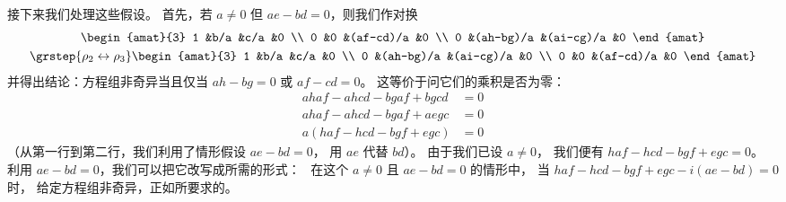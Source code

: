 \begin{answer}
\begin{exparts}
         接下来我们处理这些假设。
         首先，若 \( a\neq 0 \) 但 \( ae-bd=0 \)，则我们作对换
         \begin{multline*}
           \begin{amat}{3}
              1   &b/a           &c/a        &0   \\
              0   &0             &(af-cd)/a  &0   \\
              0   &(ah-bg)/a     &(ai-cg)/a  &0
            \end{amat}                                    \\
           \grstep{\rho_2\leftrightarrow\rho_3}
           \begin{amat}{3}
              1   &b/a           &c/a        &0   \\
              0   &(ah-bg)/a     &(ai-cg)/a  &0   \\
              0   &0             &(af-cd)/a  &0
            \end{amat}
         \end{multline*}
         并得出结论：方程组非奇异当且仅当
         \( ah-bg=0 \) 或 \( af-cd=0 \)。
         这等价于问它们的乘积是否为零：
         \begin{align*}
            ahaf-ahcd-bgaf+bgcd
            &=0                   \\
            ahaf-ahcd-bgaf+aegc
            &=0                   \\
            a(haf-hcd-bgf+egc)
            &=0
         \end{align*}
         （从第一行到第二行，我们利用了情形假设 $ae-bd=0$，
         用 $ae$ 代替 $bd$）。
         由于我们已设 \( a\neq 0 \)，
         我们便有 \( haf-hcd-bgf+egc=0 \)。
         利用 $ae-bd=0$，我们可以把它改写成所需的形式：~
         在这个 \( a\neq 0 \) 且 \( ae-bd=0 \) 的情形中，
         当
         \( haf-hcd-bgf+egc-i(ae-bd)=0 \) 时，
         给定方程组非奇异，正如所要求的。


\end{exparts}
\end{answer}
